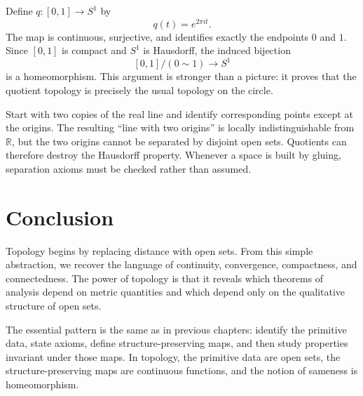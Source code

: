 \begin{example}
Define $q:[0,1]\to S^1$ by
\[
    q(t)=e^{2\pi i t}.
\]
The map is continuous, surjective, and identifies exactly the endpoints $0$ and $1$. Since $[0,1]$ is compact and $S^1$ is Hausdorff, the induced bijection
\[
    [0,1]/(0\sim1)\longrightarrow S^1
\]
is a homeomorphism. This argument is stronger than a picture: it proves that the quotient topology is precisely the usual topology on the circle.
\end{example}

\begin{example}
Start with two copies of the real line and identify corresponding points except at the origins. The resulting ``line with two origins'' is locally indistinguishable from $\mathbb{R}$, but the two origins cannot be separated by disjoint open sets. Quotients can therefore destroy the Hausdorff property. Whenever a space is built by gluing, separation axioms must be checked rather than assumed.
\end{example}

\section{Conclusion}

Topology begins by replacing distance with open sets. From this simple abstraction, we recover the language of continuity, convergence, compactness, and connectedness. The power of topology is that it reveals which theorems of analysis depend on metric quantities and which depend only on the qualitative structure of open sets.

The essential pattern is the same as in previous chapters: identify the primitive data, state axioms, define structure-preserving maps, and then study properties invariant under those maps. In topology, the primitive data are open sets, the structure-preserving maps are continuous functions, and the notion of sameness is homeomorphism.

